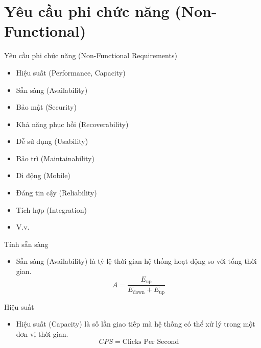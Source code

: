 \section{Yêu cầu phi chức năng (Non-Functional)}

\begin{frame}{Yêu cầu phi chức năng (Non-Functional Requirements)}
    \begin{block}{}
        \begin{itemize}
            \item Hiệu suất (Performance, Capacity)
            \item Sẵn sàng (Availability)
            \item Bảo mật (Security)
            \item Khả năng phục hồi (Recoverability)
            \item Dễ sử dụng (Usability)
            \item Bảo trì (Maintainability)
            \item Di động (Mobile)
            \item Đáng tin cậy (Reliability)
            \item Tích hợp (Integration)
            \item V.v.
        \end{itemize}
    \end{block}
\end{frame}

\begin{frame}{Tính sẵn sàng}
    \begin{block}{}
        \begin{itemize}
            \item Sẵn sàng (Availability) là tỷ lệ thời gian hệ thống
            hoạt động so với tổng thời gian.
            \[A = \dfrac{E_\text{up}}{E_\text{down} + E_\text{up}}\]
        \end{itemize}
    \end{block}
\end{frame}

\begin{frame}{Hiệu suất}
    \begin{block}{}
        \begin{itemize}
            \item Hiệu suất (Capacity) là số lần giao tiếp mà hệ thống
            có thể xử lý trong một đơn vị thời gian.
            \[CPS = \text{Clicks Per Second}\]
        \end{itemize}
    \end{block}
\end{frame}

